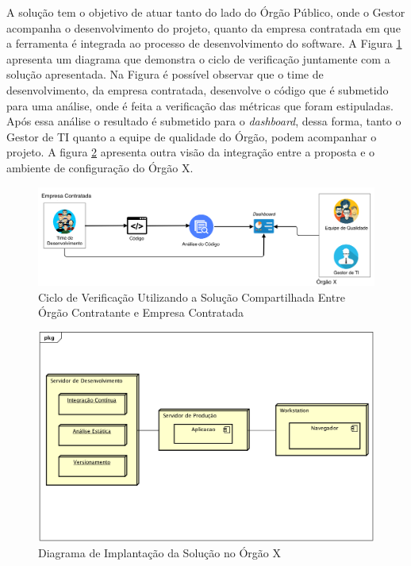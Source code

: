 A solução tem o objetivo de atuar tanto do lado do Órgão Público, onde o Gestor acompanha o desenvolvimento do projeto, quanto da empresa contratada em que a ferramenta é integrada ao processo de desenvolvimento do software. A Figura \ref{img:ciclo_ver} apresenta um diagrama que demonstra o ciclo de verificação juntamente com a solução apresentada. Na Figura é possível observar que o time de desenvolvimento, da empresa contratada, desenvolve o código que é submetido para uma análise, onde é feita a verificação das métricas que foram estipuladas. Após essa análise o resultado é submetido para o \textit{dashboard},  dessa forma, tanto o Gestor de TI quanto a equipe de qualidade do Órgão, podem acompanhar o projeto. A figura \ref{img:diagram_implantacao} apresenta outra visão da integração entre a proposta e o ambiente de configuração do Órgão X.

\graphicspath{{figuras/}}
\begin{figure}[!]
\centering
\includegraphics[scale=0.30]{proc_ver.png}
\caption{Ciclo de Verificação Utilizando a Solução Compartilhada Entre Órgão Contratante e Empresa Contratada}
\label{img:ciclo_ver}
\end{figure}

\graphicspath{{figuras/}}
\begin{figure}[!]
\centering
\includegraphics[scale=0.60]{diagrama_implantacao}
\caption{Diagrama de Implantação da Solução no Órgão X} 
\label{img:diagram_implantacao}
\end{figure}


